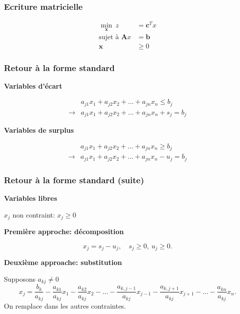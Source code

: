 \documentclass[usepdftitle=false]{beamer}
\def\bb{\boldsymbol{b}}
\def\bc{\boldsymbol{c}}
\def\bx{\boldsymbol{x}}
\def\bA{\boldsymbol{A}}
\begin{document}
\begin{frame}
\frametitle{Ecriture matricielle}

\begin{align*}
\min_{\bx} \ z &= \bc^T x \\
\mbox{sujet à } \bA x &= \bb \\
\bx & \geq 0
\end{align*}

\end{frame}

\begin{frame}
\frametitle{Retour à la forme standard}

{\bf Variables d'écart}

\begin{align*}
& a_{j1}x_1 + a_{j2}x_2 + \ldots + a_{jn}x_n \leq b_j \\
\rightarrow & a_{j1}x_1 + a_{j2}x_2 + \ldots + a_{jn}x_n + s_j = b_j \end{align*}

\mbox{}

{\bf Variables de surplus}

\begin{align*}
& a_{j1}x_1 + a_{j2}x_2 + \ldots + a_{jn}x_n \geq b_j \\
\rightarrow & a_{j1}x_1 + a_{j2}x_2 + \ldots + a_{jn}x_n - u_j = b_j \end{align*}

\end{frame}

\begin{frame}
\frametitle{Retour à la forme standard (suite)}

{\bf Variables libres}

$x_j$ non contraint: \sout{$x_j \geq 0$}

\mbox{}

{\bf Première approche: décomposition}

\[
x_j = s_j - u_j,\quad s_j \geq 0,\ u_j \geq 0.
\]

\mbox{}

{\bf Deuxième approache: substitution}

Supposons $a_{kj} \ne 0$
\[
x_j = \frac{b_k}{a_{kj}} - \frac{a_{k1}}{a_{kj}}x_1 - \frac{a_{k2}}{a_{kj}}x_2 - \ldots - \frac{a_{k,j-1}}{a_{kj}}x_{j-1} - \frac{a_{k,j+1}}{a_{kj}}x_{j+1} -  \ldots - \frac{a_{kn}}{a_{kj}}x_n.
\]
On remplace dans les autres contraintes.

\end{frame}
\end{document}
